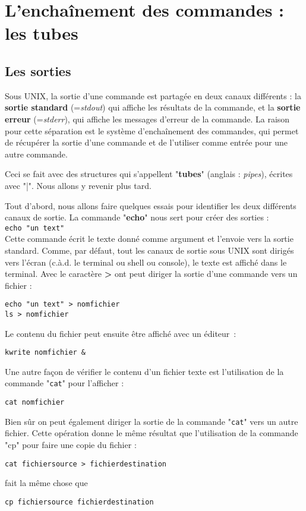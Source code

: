 \documentclass[12pt,a4paper]{article}
\begin{document}
\section{L'enchaînement des commandes : les tubes}
\subsection{Les sorties}

Sous UNIX, la sortie d'une commande est partagée en deux canaux
différents : la \textbf{sortie standard} (=\textit{stdout}) qui affiche les
résultats de la commande, et la \textbf{sortie erreur}
(=\textit{stderr}), qui affiche 
les messages d'erreur de la commande. La raison pour cette séparation
est le système d'enchaînement des commandes, qui permet de
récupérer la sortie d'une commande et de l'utiliser comme entrée
pour une autre commande. 

Ceci se fait avec des structures qui
s'appellent "\textbf{tubes}" (anglais : \textit{pipes}), écrites avec
"|". Nous allons y revenir plus tard. 

Tout d'abord, nous allons faire quelques essais
pour identifier les deux différents canaux de sortie. La commande
"\textbf{echo}" nous sert pour créer des sorties : \\
\texttt{echo "un text"} \\
Cette
commande écrit le texte donné comme argument et l'envoie vers la
sortie standard. Comme, par défaut, tout les canaux de sortie sous
UNIX sont dirigés vers l'écran (c.à.d. le terminal ou shell ou
console), le texte
est affiché dans le terminal. Avec le caractère \textbf{>} ont peut diriger la
sortie d'une commande vers un fichier : \\
\begin{verbatim}
echo "un text" > nomfichier 
ls > nomfichier
\end{verbatim}
Le contenu du fichier peut ensuite être affiché
avec un éditeur~:
\begin{verbatim}
kwrite nomfichier &
\end{verbatim}
Une autre façon de vérifier le contenu
d'un fichier texte est l'utilisation de la commande "\texttt{cat}"
pour l'afficher : 
\begin{verbatim}
cat nomfichier
\end{verbatim}
Bien sûr on peut
également diriger la sortie de la commande "\texttt{cat}" vers un autre
fichier. Cette opération donne le même résultat que l'utilisation
de la commande "cp" pour faire une copie du fichier : 
\begin{verbatim}
cat fichiersource > fichierdestination
\end{verbatim}
fait la même chose que
\begin{verbatim}
cp fichiersource fichierdestination
\end{verbatim}
\end{document}
